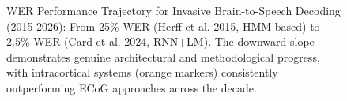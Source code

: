 \begin{figure}[h!]
\caption{WER Performance Trajectory for Invasive Brain-to-Speech Decoding (2015-2026): From 25\% WER (Herff et al. 2015, HMM-based) to 2.5\% WER (Card et al. 2024, RNN+LM). The downward slope demonstrates genuine architectural and methodological progress, with intracortical systems (orange markers) consistently outperforming ECoG approaches across the decade.}
\label{fig:wer_trajectory}
\end{figure}


